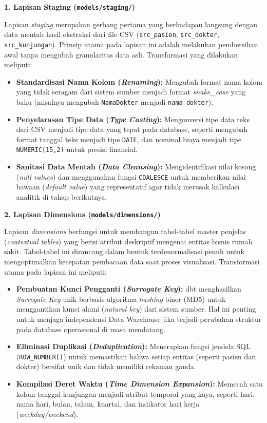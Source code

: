 \textbf{1. Lapisan Staging (\texttt{models/staging/})}
 
Lapisan \textit{staging} merupakan gerbang pertama yang berhadapan langsung dengan data mentah hasil ekstraksi dari file CSV (\texttt{src\_pasien}, \texttt{src\_dokter}, \texttt{src\_kunjungan}). Prinsip utama pada lapisan ini adalah melakukan pembersihan awal tanpa mengubah granularitas data asli. Transformasi yang dilakukan meliputi:
 
\begin{itemize}
    \item \textbf{Standardisasi Nama Kolom (\textit{Renaming}):} Mengubah format nama kolom yang tidak seragam dari sistem sumber menjadi format \textit{snake\_case} yang baku (misalnya mengubah \texttt{NamaDokter} menjadi \texttt{nama\_dokter}).
    \item \textbf{Penyelarasan Tipe Data (\textit{Type Casting}):} Mengonversi tipe data teks dari CSV menjadi tipe data yang tepat pada database, seperti mengubah format tanggal teks menjadi tipe \texttt{DATE}, dan nominal biaya menjadi tipe \texttt{NUMERIC(15,2)} untuk presisi finansial.
    \item \textbf{Sanitasi Data Mentah (\textit{Data Cleansing}):} Mengidentifikasi nilai kosong (\textit{null values}) dan menggunakan fungsi \texttt{COALESCE} untuk memberikan nilai bawaan (\textit{default value}) yang representatif agar tidak merusak kalkulasi analitik di tahap berikutnya.
\end{itemize}
 
\textbf{2. Lapisan Dimensions (\texttt{models/dimensions/})}
 
Lapisan \textit{dimensions} berfungsi untuk membangun tabel-tabel master penjelas (\textit{contextual tables}) yang berisi atribut deskriptif mengenai entitas bisnis rumah sakit. Tabel-tabel ini dirancang dalam bentuk terdenormalisasi penuh untuk mengoptimalkan kecepatan pembacaan data saat proses visualisasi. Transformasi utama pada lapisan ini meliputi:
 
\begin{itemize}
    \item \textbf{Pembuatan Kunci Pengganti (\textit{Surrogate Key}):} dbt menghasilkan \textit{Surrogate Key} unik berbasis algoritma \textit{hashing} biner (MD5) untuk menggantikan kunci alami (\textit{natural key}) dari sistem sumber. Hal ini penting untuk menjaga independensi Data Warehouse jika terjadi perubahan struktur pada database operasional di masa mendatang.
    \item \textbf{Eliminasi Duplikasi (\textit{Deduplication}):} Menerapkan fungsi jendela SQL (\texttt{ROW\_NUMBER()}) untuk memastikan bahwa setiap entitas (seperti pasien dan dokter) bersifat unik dan tidak memiliki rekaman ganda.
    \item \textbf{Kompilasi Deret Waktu (\textit{Time Dimension Expansion}):} Memecah satu kolom tanggal kunjungan menjadi atribut temporal yang kaya, seperti hari, nama hari, bulan, tahun, kuartal, dan indikator hari kerja (\textit{weekday/weekend}).
\end{itemize}
 
